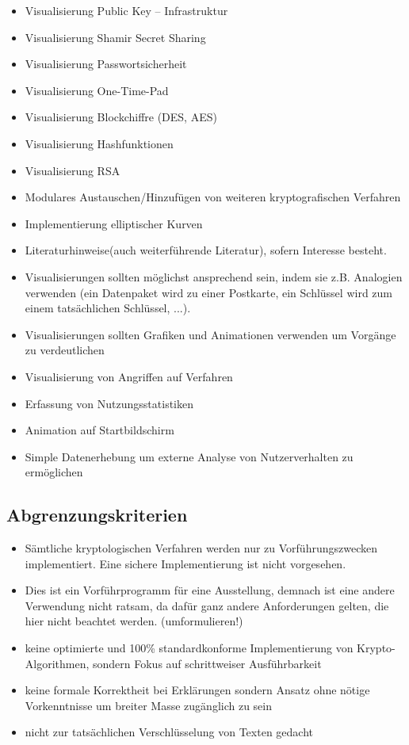 \documentclass{article}
\begin{document}
\begin{itemize}
    \item Visualisierung Public Key – Infrastruktur
    \item Visualisierung Shamir Secret Sharing
    \item Visualisierung Passwortsicherheit
    \item Visualisierung One-Time-Pad
    \item Visualisierung Blockchiffre (DES, AES)
    \item Visualisierung Hashfunktionen
    \item Visualisierung RSA
    \item Modulares Austauschen/Hinzufügen von weiteren kryptografischen Verfahren
    \item Implementierung elliptischer Kurven
    \item Literaturhinweise(auch weiterführende Literatur), sofern Interesse besteht.
    \item Visualisierungen sollten möglichst ansprechend sein, indem sie z.B. Analogien 
        verwenden (ein Datenpaket wird zu einer Postkarte, ein Schlüssel wird zum einem tatsächlichen Schlüssel, ...).
    \item Visualisierungen sollten Grafiken und Animationen verwenden um Vorgänge zu verdeutlichen
    \item Visualisierung von Angriffen auf Verfahren
    \item Erfassung von Nutzungsstatistiken
    \item Animation auf Startbildschirm
    \item Simple Datenerhebung um externe Analyse von Nutzerverhalten zu ermöglichen
\end{itemize}

\subsection{Abgrenzungskriterien}
\begin{itemize}
    \item Sämtliche kryptologischen Verfahren werden nur zu Vorführungszwecken implementiert. Eine sichere Implementierung ist nicht vorgesehen.
    \item Dies ist ein Vorführprogramm für eine Ausstellung, demnach ist eine andere  Verwendung nicht ratsam, 
        da dafür ganz andere Anforderungen gelten, die hier nicht beachtet werden. (umformulieren!)
    \item keine optimierte und 100\% standardkonforme Implementierung von Krypto-Algorithmen, 
        sondern Fokus auf schrittweiser Ausführbarkeit
    \item keine formale Korrektheit bei Erklärungen sondern Ansatz ohne nötige Vorkenntnisse 
        um breiter Masse zugänglich zu sein
    \item nicht zur tatsächlichen Verschlüsselung von Texten gedacht 
\end{itemize}
\end{document}
